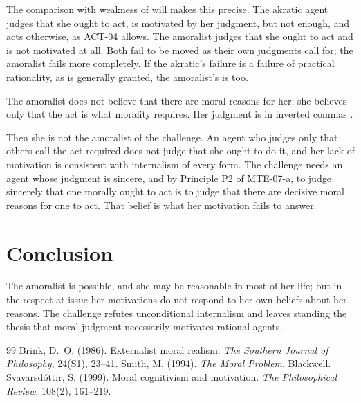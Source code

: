 \documentclass{situationist-preprint}
\begin{document}
The comparison with weakness of will makes this precise. The akratic agent judges that she ought to act, is motivated by her judgment, but not enough, and acts otherwise, as ACT-04 allows. The amoralist judges that she ought to act and is not motivated at all. Both fail to be moved as their own judgments call for; the amoralist fails more completely. If the akratic's failure is a failure of practical rationality, as is generally granted, the amoralist's is too.

\begin{objection}
The amoralist does not believe that there are moral reasons for her; she believes only that the act is what morality requires. Her judgment is in inverted commas \citep[ch.~3]{Smith1994}.
\end{objection}

\begin{reply}
Then she is not the amoralist of the challenge. An agent who judges only that others call the act required does not judge that she ought to do it, and her lack of motivation is consistent with internalism of every form. The challenge needs an agent whose judgment is sincere, and by Principle P2 of MTE-07-a, to judge sincerely that one morally ought to act is to judge that there are decisive moral reasons for one to act. That belief is what her motivation fails to answer.
\end{reply}

\section{Conclusion}

The amoralist is possible, and she may be reasonable in most of her life; but in the respect at issue her motivations do not respond to her own beliefs about her reasons. The challenge refutes unconditional internalism and leaves standing the thesis that moral judgment necessarily motivates rational agents.

\begin{thebibliography}{99}\small
{} Brink, D.~O. (1986). Externalist moral realism. \emph{The Southern Journal of Philosophy}, 24(S1), 23--41.
 Smith, M. (1994). \emph{The Moral Problem}. Blackwell.
 Svavarsd\'ottir, S. (1999). Moral cognitivism and motivation. \emph{The Philosophical Review}, 108(2), 161--219.
\end{thebibliography}
\end{document}
